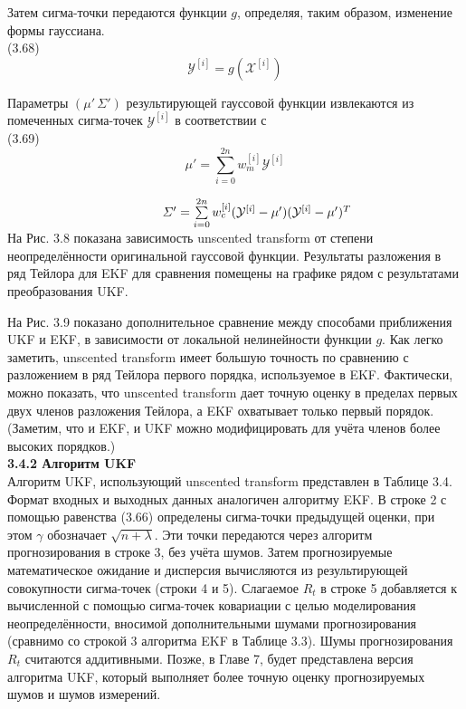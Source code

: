 \documentclass[10pt,a4paper]{article}
\begin{document}
Затем сигма-точки передаются функции $g$, определяя, таким образом, изменение формы гауссиана.\\

(3.68)
$$\mathcal Y^{[i]}=g(\mathcal X^{[i]})$$

Параметры $(\mu'\,\varSigma')$ результирующей гауссовой функции извлекаются из помеченных сигма-точек $\mathcal Y^{[i]}$ в соответствии с\\

(3.69)
$$\mu'=\sum_{i=0}^{2n}w_m^{[i]}\mathcal Y^{[i]}$$

$\hspace{43mm}\varSigma'=\sum\limits_{i=0}^{2n}w_c^{[i]}(\mathcal Y^{[i]}-\mu')(\mathcal Y^{[i]}-\mu')^T$\\

На Рис. 3.8 показана зависимость unscented transform от степени неопределённости оригинальной гауссовой функции. Результаты разложения в ряд Тейлора для EKF для сравнения помещены на графике рядом с результатами преобразования UKF.

На Рис. 3.9 показано дополнительное сравнение между способами приближения UKF и EKF, в зависимости от локальной нелинейности функции $g$. Как легко заметить, unscented transform имеет большую точность по сравнению с разложением в ряд Тейлора первого порядка, используемое в EKF. Фактически, можно показать, что unscented transform дает точную оценку в пределах первых двух членов разложения Тейлора, а EKF охватывает только первый порядок. (Заметим, что и EKF, и UKF можно модифицировать для учёта членов более высоких порядков.)\\

\textbf{3.4.2 Алгоритм UKF}\\

Алгоритм UKF, использующий unscented transform представлен в Таблице 3.4. Формат входных и выходных данных аналогичен алгоритму EKF. В строке 2 с помощью равенства (3.66) определены сигма-точки предыдущей оценки, при этом $\gamma$ обозначает $\sqrt{n+\lambda}$. Эти точки передаются через алгоритм прогнозирования в строке 3, без учёта шумов. Затем прогнозируемые математическое ожидание и дисперсия вычисляются из результирующей совокупности сигма-точек (строки 4 и 5). Слагаемое $R_t$ в строке 5 добавляется к вычисленной с помощью сигма-точек ковариации с целью моделирования неопределённости, вносимой дополнительными  шумами прогнозирования (сравнимо со строкой 3 алгоритма EKF в Таблице 3.3). Шумы прогнозирования $R_t$ считаются аддитивными. Позже, в Главе 7, будет представлена версия алгоритма UKF, который выполняет более точную оценку прогнозируемых шумов и шумов измерений.
\end{document}
